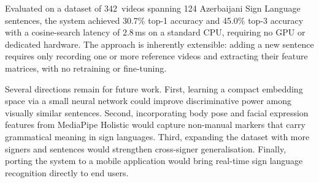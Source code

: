 \documentclass[runningheads]{llncs}
\begin{document}
Evaluated on a dataset of 342~videos spanning 124 Azerbaijani Sign
Language sentences, the system achieved 30.7\% top-1 accuracy and
45.0\% top-3 accuracy with a cosine-search latency of 2.8\,ms on a
standard CPU, requiring no GPU or dedicated hardware.
The approach is inherently extensible: adding a new sentence requires
only recording one or more reference videos and extracting their
feature matrices, with no retraining or fine-tuning.

Several directions remain for future work.
First, learning a compact embedding space via a small neural network
could improve discriminative power among visually similar sentences.
Second, incorporating body pose and facial expression features from
MediaPipe Holistic would capture non-manual markers that carry
grammatical meaning in sign languages.
Third, expanding the dataset with more signers and sentences would
strengthen cross-signer generalisation.
Finally, porting the system to a mobile application would bring
real-time sign language recognition directly to end users.
\end{document}
